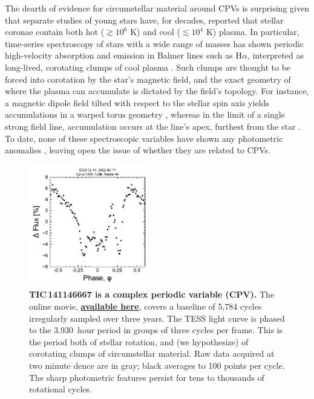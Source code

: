 \documentclass[11pt,twocolumn,tighten,linenumbers]{aastex7}
\newcommand{\periodhr}{3.930}
\begin{document}
The dearth of evidence for circumstellar material around CPVs is
surprising given that separate studies of young stars have, for
decades, reported that stellar coronae contain both hot
($\gtrsim$$10^6$ K) and cool ($\lesssim$$10^4$ K) plasma. In
particular, time-series spectroscopy of stars with a wide range of
masses has shown periodic high-velocity absorption and emission in
Balmer lines such as H$\alpha$, interpreted as long-lived, corotating
clumps of cool plasma
\citep{CollierCameron1989,CollierCameron1992,Barnes2000,Donati2000,Dunstone2006,Skelly2008,Leitzinger2016,Cang2021}.
Such clumps are thought to be forced into corotation by the star's magnetic
field, and the exact geometry of where the plasma can accumulate is
dictated by the field's topology.  For instance, a magnetic dipole
field tilted with respect to the stellar spin axis yields
accumulations in a warped torus geometry \citep{Townsend2005}, whereas
in the limit of a single strong field line, accumulation occurs at the
line's apex, furthest from the star \citep{Waugh2022}.  To date, none
of these spectroscopic variables have shown any photometric anomalies
\citep{Bouma2024}, leaving open the issue of whether they are related
to CPVs.

\begin{figure}[!t]
  \centering
  \includegraphics[width=0.47\textwidth]{f1.pdf}
  \vspace{-0.4cm}
  \captionsetup{labelformat=moviefmt,labelsep=colon}
	\caption{\textbf{TIC\,141146667 is a complex periodic variable (CPV).}  The
online movie,
  \href{https://lgbouma.com/movies/TIC141146667_20250116.mp4}{{\bf
  available here}},
  covers a baseline of 5{,}784 cycles irregularly sampled over three
  years.  The TESS light curve is phased to the \periodhr\ hour period
  in groups of three cycles per frame.  This is the period both of
  stellar rotation, and (we hypothesize) of corotating clumps of
  circumstellar material.  Raw data acquired at two minute dence
  are in gray; black averages to 100 points per cycle.  
  The sharp photometric features persist
  for tens to thousands of rotational cycles. }
  \label{fig:lc}
\end{figure}
\end{document}
